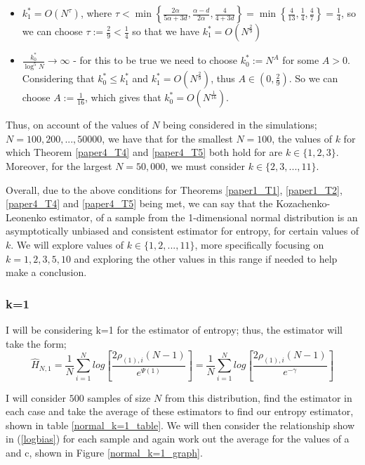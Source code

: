 \documentclass{article}
\begin{document}
\begin{itemize}
\item $k_{1}^{*} = O(N^{\tau})$, where $\tau < \min \left\{ \frac{2 \alpha}{5 \alpha + 3d} , \frac{\alpha - d}{2 \alpha} , \frac{4}{4 + 3d} \right\} = \min \left\{ \frac{4}{13}, \frac{1}{4}, \frac{4}{7} \right\} = \frac{1}{4}$, so we can choose $\tau := \frac{2}{9} < \frac{1}{4}$ so that we have $k_{1}^{*} = O(N^{\frac{2}{9}})$

\item $\frac{k_{0}^{*}}{\log^{5}{N}} \to \infty$ - for this to be true we need to choose $k_{0}^{*} := N^A$ for some $A>0$. Considering that $k_{0}^{*} \leq k_{1}^{*}$ and $ k_{1}^{*} = O(N^{\frac{2}{9}})$, thus $A \in (0, \frac{2}{9})$. So we can choose $A := \frac{1}{16}$, which gives that $k_{0}^{*} = O(N^{\frac{1}{16}})$.
\end{itemize}

Thus, on account of the values of $N$ being considered in the simulations; $N=100, 200, ..., 50000$, we have that for the smallest $N=100$, the values of $k$ for which Theorem \ref{paper4_T4} and \ref{paper4_T5} both hold for are $k \in \{1, 2, 3\}$. Moreover, for the largest $N=50,000$, we must consider $k \in \{2, 3, ..., 11\}$.

Overall, due to the above conditions for Theorems \ref{paper1_T1}, \ref{paper1_T2}, \ref{paper4_T4} and \ref{paper4_T5} being met, we can say that the Kozachenko-Leonenko estimator, of a sample from the 1-dimensional normal distribution is an asymptotically unbiased and consistent estimator for entropy, for certain values of $k$. We will explore values of $k \in \{1, 2, ..., 11\}$, more specifically focusing on $k=1, 2, 3, 5, 10$ and exploring the other values in this range if needed to help make a conclusion.




\subsubsection{k=1} \label{N_k=1}
I will be considering k=1 for the estimator of entropy; thus, the estimator will take the form;
\begin{equation} 
\hat{H}_{N, 1} = \frac{1}{N} \sum_{i=1}^{N} log \left[ \frac{2\rho_{(1),i} (N-1)}{e^{\Psi(1)}} \right] = \frac{1}{N} \sum_{i=1}^{N} log \left[ \frac{2\rho_{(1),i} (N-1)}{e^{-\gamma}} \right] \nonumber
\end{equation}

I will consider $500$ samples of size $N$ from this distribution, find the estimator in each case and take the average of these estimators to find our entropy estimator, shown in table \ref{normal_k=1_table}. We will then consider the relationship show in (\ref{logbias}) for each sample and again work out the average for the values of a and c, shown in Figure \ref{normal_k=1_graph}.
\end{document}
